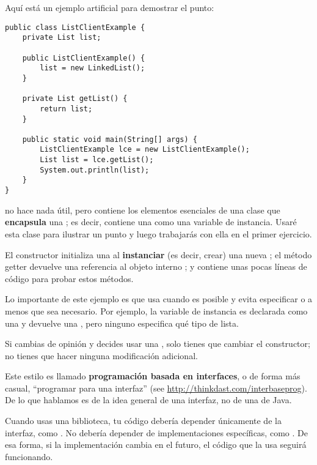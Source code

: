 \documentclass[12pt]{book}
\theoremstyle{exercise}
\begin{document}
Aquí está un ejemplo artificial para demostrar el punto:

\begin{verbatim}
public class ListClientExample {
    private List list;
    
    public ListClientExample() {
        list = new LinkedList();
    }

    private List getList() {
        return list;        
    }

    public static void main(String[] args) {
        ListClientExample lce = new ListClientExample();
        List list = lce.getList();
        System.out.println(list);
    }
}
\end{verbatim}


 no hace nada útil, pero contiene los
elementos esenciales de una clase que {\bf encapsula} una
; es decir, contiene una  como una variable
de instancia. Usaré esta clase para ilustrar un punto y luego
trabajarás con ella en el primer ejercicio.


El constructor  initializa una  al
{\bf instanciar} (es decir, crear) una nueva ; el
método getter  devuelve una referencia al objeto
interno ; y  contiene unas pocas líneas
de código para probar estos métodos.

Lo importante de este ejemplo es que usa 
cuando es posible y evita especificar  o
 a menos que sea necesario. Por ejemplo, la variable
de instancia es declarada como una  y  devuelve
una , pero ninguno especifica qué tipo de lista.

Si cambias de opinión y decides usar una , solo tienes
que cambiar el constructor; no tienes que hacer ninguna modificación
adicional.


Este estilo es llamado {\bf programación basada en interfaces},
o de forma más casual, ``programar para una interfaz''
(see \url{http://thinkdast.com/interbaseprog}).
De lo que hablamos es de la idea general de una interfaz, no de
una  de Java.

Cuando usas una biblioteca, tu código debería depender únicamente de
la interfaz, como .  No debería depender de implementaciones
específicas, como . De esa forma, si la implementación
cambia en el futuro, el código que la usa seguirá funcionando.
\end{document}
